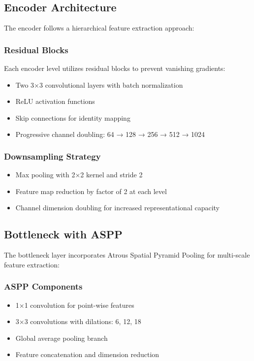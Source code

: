 \subsection{Encoder Architecture}

The encoder follows a hierarchical feature extraction approach:

\subsubsection{Residual Blocks}
Each encoder level utilizes residual blocks to prevent vanishing gradients:
\begin{itemize}
\item Two 3×3 convolutional layers with batch normalization
\item ReLU activation functions
\item Skip connections for identity mapping
\item Progressive channel doubling: 64 → 128 → 256 → 512 → 1024
\end{itemize}

\subsubsection{Downsampling Strategy}
\begin{itemize}
\item Max pooling with 2×2 kernel and stride 2
\item Feature map reduction by factor of 2 at each level
\item Channel dimension doubling for increased representational capacity
\end{itemize}

\subsection{Bottleneck with ASPP}

The bottleneck layer incorporates Atrous Spatial Pyramid Pooling for multi-scale feature extraction:

\subsubsection{ASPP Components}
\begin{itemize}
\item 1×1 convolution for point-wise features
\item 3×3 convolutions with dilations: 6, 12, 18
\item Global average pooling branch
\item Feature concatenation and dimension reduction
\end{itemize}

